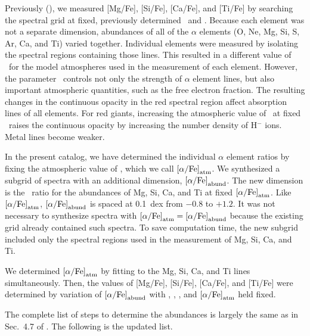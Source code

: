 \documentclass{emulateapj}
\begin{document}
Previously (\citeauthor*{kir09}), we measured [Mg/Fe], [Si/Fe],
[Ca/Fe], and [Ti/Fe] by searching the spectral grid at fixed,
previously determined \teff\ and \feh.  Because each element was not a
separate dimension, abundances of all of the $\alpha$ elements (O, Ne,
Mg, Si, S, Ar, Ca, and Ti) varied together.  Individual elements were
measured by isolating the spectral regions containing those lines.
This resulted in a different value of \afe\ for the model atmospheres
used in the measurement of each element.  However, the parameter
\afe\ controls not only the strength of $\alpha$ element lines, but
also important atmospheric quantities, such as the free electron
fraction.  The resulting changes in the continuous opacity in the red
spectral region affect absorption lines of all elements.  For red
giants, increasing the atmospheric value of \afe\ at fixed
\feh\ raises the continuous opacity by increasing the number density
of H$^{-}$ ions.  Metal lines become weaker.

In the present catalog, we have determined the individual $\alpha$
element ratios by fixing the atmospheric value of \afe, which we call
${\rm [\alpha/Fe]}_{\rm atm}$.  We synthesized a subgrid of spectra
with an additional dimension, ${\rm [\alpha/Fe]}_{\rm abund}$.  The
new dimension is the \afe\ ratio for the abundances of Mg, Si, Ca, and
Ti at fixed ${\rm [\alpha/Fe]}_{\rm atm}$.  Like ${\rm
  [\alpha/Fe]}_{\rm atm}$, ${\rm [\alpha/Fe]}_{\rm abund}$ is spaced
at 0.1~dex from $-0.8$ to $+1.2$.  It was not necessary to synthesize
spectra with ${\rm [\alpha/Fe]}_{\rm atm} = {\rm [\alpha/Fe]}_{\rm
  abund}$ because the existing grid already contained such spectra.
To save computation time, the new subgrid included only the spectral
regions used in the measurement of Mg, Si, Ca, and Ti.

We determined ${\rm [\alpha/Fe]}_{\rm atm}$ by fitting to the Mg, Si,
Ca, and Ti lines simultaneously.  Then, the values of [Mg/Fe],
[Si/Fe], [Ca/Fe], and [Ti/Fe] were determined by variation of ${\rm
  [\alpha/Fe]}_{\rm abund}$ with \teff, \logg, \feh, and ${\rm
  [\alpha/Fe]}_{\rm atm}$ held fixed.

The complete list of steps to determine the abundances is largely the
same as in Sec.~4.7 of \citeauthor*{kir09}.  The following is the
updated list.
\end{document}
